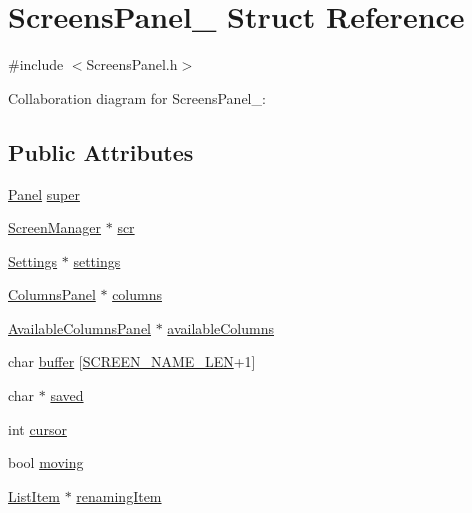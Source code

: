 \hypertarget{structScreensPanel__}{}\section{Screens\+Panel\+\_\+ Struct Reference}
\label{structScreensPanel__}


{\ttfamily \#include $<$Screens\+Panel.\+h$>$}



Collaboration diagram for Screens\+Panel\+\_\+\+:
\subsection*{Public Attributes}
\begin{DoxyCompactItemize}
\item 
\hyperlink{Panel_8h_a034d4c16521db412dc7a1e8536d16fae}{Panel} \hyperlink{structScreensPanel___a252518387b381f1b88b4f56797e94cf3}{super}
\item 
\hyperlink{ScreenManager_8h_a798c9c69dc8024a4c6829982bf94dddd}{Screen\+Manager} $\ast$ \hyperlink{structScreensPanel___ab91b13a07df3318a3837d20eacfc8d60}{scr}
\item 
\hyperlink{Settings_8h_ad97e5960b63f21c02bf5e0e43c0ef002}{Settings} $\ast$ \hyperlink{structScreensPanel___acbbcee5a923b68441ac783a11fa64b5e}{settings}
\item 
\hyperlink{ColumnsPanel_8h_ac062bce2337a8f2cfb7c985de1e98dcf}{Columns\+Panel} $\ast$ \hyperlink{structScreensPanel___a8e8ee3adf4ccf050911592cda40a4bf6}{columns}
\item 
\hyperlink{AvailableColumnsPanel_8h_a7c59214c74f8285d43771c82a59afbab}{Available\+Columns\+Panel} $\ast$ \hyperlink{structScreensPanel___a551fac48c4ed76485d9884c77cc63c4a}{available\+Columns}
\item 
char \hyperlink{structScreensPanel___a4d586061a0d1fb6f8e0e38e085861571}{buffer} \mbox{[}\hyperlink{ScreensPanel_8h_a6a469d800d9e4ad22e6529c6e1148ffd}{S\+C\+R\+E\+E\+N\+\_\+\+N\+A\+M\+E\+\_\+\+L\+EN}+1\mbox{]}
\item 
char $\ast$ \hyperlink{structScreensPanel___a8db5747438a3dbbaf0c316713e5da4df}{saved}
\item 
int \hyperlink{structScreensPanel___a4c306ae330bda7b005d8c45530066f78}{cursor}
\item 
bool \hyperlink{structScreensPanel___a97df39c502723a6f66ff7ff9777b8c4a}{moving}
\item 
\hyperlink{ListItem_8h_a311dfe5c572117175446997a9e6f15b8}{List\+Item} $\ast$ \hyperlink{structScreensPanel___a73cf318d39fca296c8c6df3aa11cacbf}{renaming\+Item}
\end{DoxyCompactItemize}


